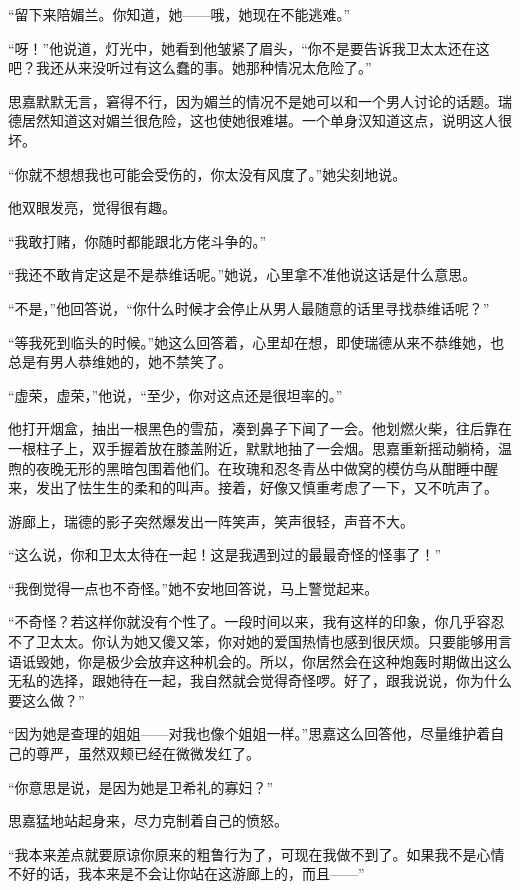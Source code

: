 \par “留下来陪媚兰。你知道，她——哦，她现在不能逃难。”
\par “呀！”他说道，灯光中，她看到他皱紧了眉头，“你不是要告诉我卫太太还在这吧？我还从来没听过有这么蠢的事。她那种情况太危险了。”
\par 思嘉默默无言，窘得不行，因为媚兰的情况不是她可以和一个男人讨论的话题。瑞德居然知道这对媚兰很危险，这也使她很难堪。一个单身汉知道这点，说明这人很坏。
\par “你就不想想我也可能会受伤的，你太没有风度了。”她尖刻地说。
\par 他双眼发亮，觉得很有趣。
\par “我敢打赌，你随时都能跟北方佬斗争的。”
\par “我还不敢肯定这是不是恭维话呢。”她说，心里拿不准他说这话是什么意思。
\par “不是，”他回答说，“你什么时候才会停止从男人最随意的话里寻找恭维话呢？”
\par “等我死到临头的时候。”她这么回答着，心里却在想，即使瑞德从来不恭维她，也总是有男人恭维她的，她不禁笑了。
\par “虚荣，虚荣，”他说，“至少，你对这点还是很坦率的。”
\par 他打开烟盒，抽出一根黑色的雪茄，凑到鼻子下闻了一会。他划燃火柴，往后靠在一根柱子上，双手握着放在膝盖附近，默默地抽了一会烟。思嘉重新摇动躺椅，温煦的夜晚无形的黑暗包围着他们。在玫瑰和忍冬青丛中做窝的模仿鸟从酣睡中醒来，发出了怯生生的柔和的叫声。接着，好像又慎重考虑了一下，又不吭声了。
\par 游廊上，瑞德的影子突然爆发出一阵笑声，笑声很轻，声音不大。
\par “这么说，你和卫太太待在一起！这是我遇到过的最最奇怪的怪事了！”
\par “我倒觉得一点也不奇怪。”她不安地回答说，马上警觉起来。
\par “不奇怪？若这样你就没有个性了。一段时间以来，我有这样的印象，你几乎容忍不了卫太太。你认为她又傻又笨，你对她的爱国热情也感到很厌烦。只要能够用言语诋毁她，你是极少会放弃这种机会的。所以，你居然会在这种炮轰时期做出这么无私的选择，跟她待在一起，我自然就会觉得奇怪啰。好了，跟我说说，你为什么要这么做？”
\par “因为她是查理的姐姐——对我也像个姐姐一样。”思嘉这么回答他，尽量维护着自己的尊严，虽然双颊已经在微微发红了。
\par “你意思是说，是因为她是卫希礼的寡妇？”
\par 思嘉猛地站起身来，尽力克制着自己的愤怒。
\par “我本来差点就要原谅你原来的粗鲁行为了，可现在我做不到了。如果我不是心情不好的话，我本来是不会让你站在这游廊上的，而且——”
